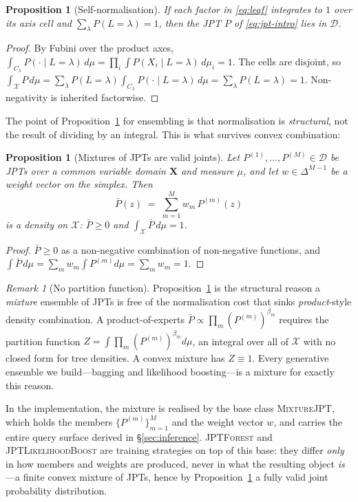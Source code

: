 \documentclass[11pt]{article}
\theoremstyle{plain}
\newtheorem{proposition}[theorem]{Proposition}
\theoremstyle{definition}
\theoremstyle{remark}
\newtheorem{remark}[theorem]{Remark}
\newcommand{\Xsp}{\mathcal{X}}
\newcommand{\Dens}{\mathcal{D}}
\newcommand{\jptforest}{\textsc{JPTForest}}
\newcommand{\likeboost}{\textsc{JPTLikelihoodBoost}}
\newcommand{\mixture}{\textsc{MixtureJPT}}
\begin{document}
\begin{proposition}[Self-normalisation]
\label{prop:jpt-norm}
If each factor in \eqref{eq:leaf} integrates to $1$ over its axis cell and
$\sum_\lambda P(L=\lambda)=1$, then the JPT $P$ of \eqref{eq:jpt-intro}
lies in $\Dens$.
\end{proposition}
\begin{proof}
By Fubini over the product axes, $\int_{C_\lambda}P(\cdot\mid L{=}\lambda)
\,d\mu=\prod_i\int P(X_i\mid L{=}\lambda)\,d\mu_i = 1$. The cells are
disjoint, so $\int_\Xsp P\,d\mu=\sum_\lambda P(L{=}\lambda)
\int_{C_\lambda}P(\cdot\mid L{=}\lambda)\,d\mu=\sum_\lambda P(L{=}\lambda)
= 1$. Non-negativity is inherited factorwise.
\end{proof}

The point of Proposition~\ref{prop:jpt-norm} for ensembling is that
normalisation is \emph{structural}, not the result of dividing by an
integral. This is what survives convex combination:

\begin{proposition}[Mixtures of JPTs are valid joints]
\label{prop:mixture-closed}
Let $P^{(1)},\dots,P^{(M)}\in\Dens$ be JPTs over a common variable domain
$\mathbf{X}$ and measure $\mu$, and let $w\in\Delta^{M-1}$ be a weight
vector on the simplex. Then
\[
\bar P(z)\;=\;\sum_{m=1}^M w_m\, P^{(m)}(z)
\]
is a density on $\Xsp$: $\bar P\ge0$ and $\int_\Xsp\bar P\,d\mu=1$.
\end{proposition}
\begin{proof}
$\bar P\ge 0$ as a non-negative combination of non-negative functions, and
$\int\bar P\,d\mu=\sum_m w_m\int P^{(m)}d\mu=\sum_m w_m=1$.
\end{proof}

\begin{remark}[No partition function]
\label{rem:no-Z}
Proposition~\ref{prop:mixture-closed} is the structural reason a
\emph{mixture} ensemble of JPTs is free of the normalisation cost that
sinks \emph{product}-style density combination. A product-of-experts
$\bar P\propto\prod_m (P^{(m)})^{\beta_m}$ requires the partition function
$Z=\int\prod_m (P^{(m)})^{\beta_m}d\mu$, an integral over all of $\Xsp$
with no closed form for tree densities. A convex mixture has $Z\equiv 1$.
Every generative ensemble we build---bagging and likelihood
boosting---is a mixture for exactly this reason.
\end{remark}

In the implementation, the mixture is realised by the base class
\mixture{}, which holds the members $\{P^{(m)}\}_{m=1}^M$ and the weight
vector $w$, and carries the entire query surface derived in
\S\ref{sec:inference}. \jptforest{} and \likeboost{} are training
strategies on top of this base: they differ \emph{only} in how members
and weights are produced, never in what the resulting object \emph{is}---a
finite convex mixture of JPTs, hence by Proposition~\ref{prop:mixture-closed}
a fully valid joint probability distribution.
\end{document}

